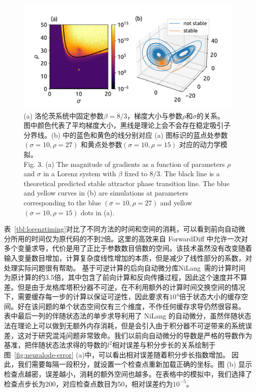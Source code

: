 \documentclass[A4,twoside,UTF8]{ctexart}
\begin{document}
\begin{figure}
\centering
\includegraphics[width=0.8\columnwidth]{./fig4.pdf}
    \caption{(a) 洛伦茨系统中固定参数$\beta=8/3$，梯度大小与参数$\rho$和$\sigma$的关系。
    图中颜色代表了平均梯度大小，黑线是理论上会不会存在稳定吸引子分界线。(b) 中的蓝色和黄色的线分别对应 (a) 图标识的蓝点处参数 $(\sigma=10, \rho=27)$ 和黄点处参数$(\sigma=10, \rho=15)$ 对应的动力学模拟。\\
    Fig. 3. (a) The magnitude of gradients as a function of parameters $\rho$ and $\sigma$ in a Lorenz system with  $\beta$ fixed to $8/3$. The black line is a theoretical predicted  stable attractor phase transition line. The blue and yellow curves in (b) are simulations at parameters corresponding to the blue $(\sigma=10, \rho=27)$ and yellow $(\sigma=10, \rho=15)$ dots in (a).
    }\label{fig:chaos}
\end{figure}
表~\ref{tbl:lorenztiming}对比了不同方法的时间和空间的消耗，可以看到前向自动微分所用的时间仅为原代码的不到2倍。这里的高效来自 ForwardDiff 中允许一次对多个变量求导，代价是用了正比于参数数目倍数的空间。该技术虽然没有改变随着输入变量数目增加，计算复杂度线性增加的本质，但是减少了线性部分的系数，对处理实际问题很有帮助。
基于可逆计算的后向自动微分库NiLang~\cite{Liu2020b}需的计算时间为原计算的约3.5倍，其中包含了前向计算和反向传播过程，因此这个速度并不算差。但是由于龙格库塔积分器不可逆，在不利用额外的计算时间交换空间的情况下，需要缓存每一步的计算以保证可逆性，因此要求有$10^4$倍于状态大小的缓存空间。好在该问题的单个状态空间仅有三个维度，不作任何缓存求导仍然很容易。
表中最后一列的伴随状态法的单步求导利用了 NiLang 的自动微分，虽然伴随状态法在理论上可以做到无额外内存消耗，但是会引入由于积分器不可逆带来的系统误差，这对于研究混沌问题非常致命。我们以前向自动微分的导数是严格的导数作为基准，把伴随状态法求得的导数的$l^2$相对误差与积分步长的关系绘制于图~\ref{fig:neuralode-error} (a)中，可以看出相对误差随着积分步长指数增加。
因此，我们需要每隔一段积分，就设置一个检查点重新加载正确的坐标。图 (b) 显示检查点越密，误差越小，消耗的额外空间也越多。在表格中的模拟中，我们选择了检查点步长为200，对应检查点数目为50，相对误差约为$10^{-5}$。
\end{document}
